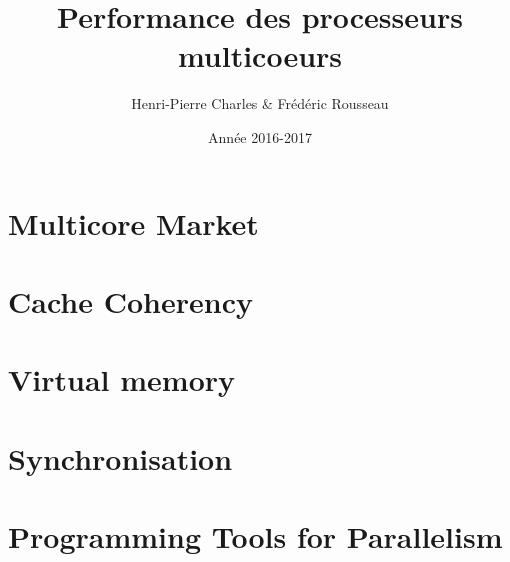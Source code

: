\documentclass{beamer}
\title{Performance des processeurs multicoeurs}
\subtitle{}
\author{Henri-Pierre Charles \& Frédéric Rousseau}
\date{Année 2016-2017}
\newcommand{\Slide}[1]{}
\begin{document}
\begin{frame}
\titlepage
\end{frame}


\section{Multicore Market}
\Slide{Market/MotivatingExample1}
\Slide{Market/MotivatingExample2}
\Slide{Market/MotivatingExample3}
\Slide{Market/MotivatingCode1}
\Slide{Market/MotivatingCode2}

\section{Cache Coherency}
\Slide{Caches/Intro}

\section{Virtual memory}
\Slide{VirtualMemory/Intro}

\section{Synchronisation}
\Slide{VirtualMemory/Synchro}

\section{Programming Tools for Parallelism}
\Slide{ProgrammingTools/Intro}
\end{document}
